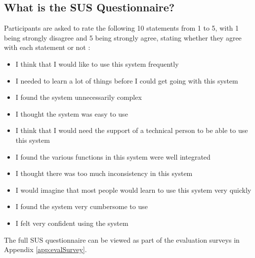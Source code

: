 \documentclass{l4proj}
\begin{document}
\subsection{What is the SUS Questionnaire?}
Participants are asked to rate the following 10 statements from 1 to 5,  with 1 being strongly disagree and 5 being strongly agree,  stating whether they agree with each statement or not \citep{T_2021}:
\begin{itemize}
    \item I think that I would like to use this system frequently
    \item I needed to learn a lot of things before I could get going with this system
    \item I found the system unnecessarily complex
    \item I thought the system was easy to use
    \item I think that I would need the support of a technical person to be able to use this system
    \item I found the various functions in this system were well integrated
    \item I thought there was too much inconsistency in this system
    \item I would imagine that most people would learn to use this system very quickly
    \item I found the system very cumbersome to use
    \item I felt very confident using the system
\end{itemize}

The full SUS questionnaire can be viewed as part of the evaluation surveys in Appendix \ref{app:evalSurvey}.
\end{document}
